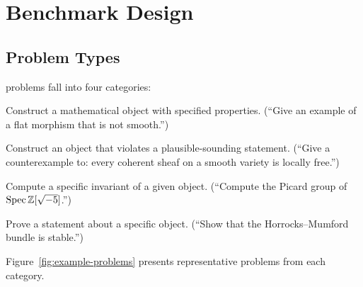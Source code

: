 \section{Benchmark Design}
\label{sec:benchmark}

\subsection{Problem Types}

\ecagbench{} problems fall into four categories:

\begin{description}[nosep]
  \item[Example (243):] Construct a mathematical object with specified properties. (``Give an example of a flat morphism that is not smooth.'')
  \item[Counterexample (66):] Construct an object that violates a plausible-sounding statement. (``Give a counterexample to: every coherent sheaf on a smooth variety is locally free.'')
  \item[Computation (14):] Compute a specific invariant of a given object. (``Compute the Picard group of $\operatorname{Spec} \mathbb{Z}[\sqrt{-5}]$.'')
  \item[Proof (9):] Prove a statement about a specific object. (``Show that the Horrocks--Mumford bundle is stable.'')
\end{description}

Figure~\ref{fig:example-problems} presents representative problems from each category.

